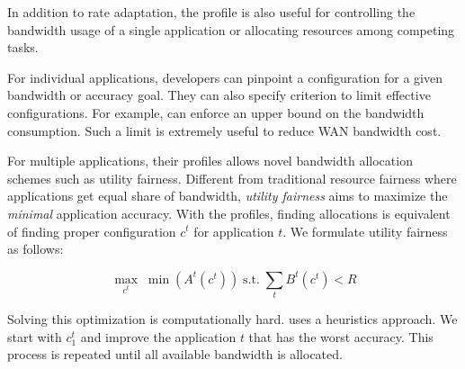 %     

 In addition to rate adaptation, the
profile is also useful for controlling the bandwidth usage of a single
application or allocating resources among competing tasks.

For individual applications, developers can pinpoint a configuration for a given
bandwidth or accuracy goal. They can also specify criterion to limit effective
configurations. For example, \sysname{} can enforce an upper bound on the
bandwidth consumption. Such a limit is extremely useful to reduce WAN bandwidth
cost.

For multiple applications, their profiles allows novel bandwidth allocation
schemes such as utility fairness. Different from traditional resource fairness
where applications get equal share of bandwidth, \textit{utility fairness} aims
to maximize the \textit{minimal} application accuracy. With the profiles,
finding allocations is equivalent of finding proper configuration $c^t$ for
application $t$. We formulate utility fairness as follows:

\begin{equation}
  \label{eq:multitask}
  \underset{c^t}{\max} \; \min({A^t(c^t)})
  \;
  \text{s.t.}
  \;
  \sum_t{B^t(c^t)} < R
\end{equation}

Solving this optimization is computationally hard. \sysname{} uses a heuristics
approach. We start with $c_1^t$ and improve the application $t$ that has the
worst accuracy. This process is repeated until all available bandwidth is
allocated.

